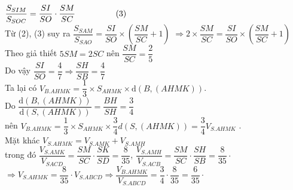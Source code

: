 \begin{ex}
{{
		}
\hspace*{0.2cm}$\dfrac{S_{SIM}}{S_{SOC}} = \dfrac{SI}{SO} \cdot \dfrac{SM}{SC} \hspace*{1.7cm} (3)$\\
Từ (2), (3) suy ra 
$ \dfrac{S_{SAM}}{S_{SAO}} = \dfrac{SI}{SO}\times \left(\dfrac{SM}{SC} + 1\right) $
$\Rightarrow 2 \times \dfrac{SM}{SC} = \dfrac{SI}{SO}\times \left(\dfrac{SM}{SC} + 1\right) $\\
Theo giả thiết $ 5SM = 2SC $ nên $ \dfrac{SM}{SC} = \dfrac{2}{5} $\\
Do vậy $ \dfrac{SI}{SO} = \dfrac{4}{7} \Rightarrow \dfrac{SH}{SB} = \dfrac{4}{7}   $\\
Ta lại có $ V_{B.AHMK} =\dfrac{1}{3} \times S_{AHMK} \times \mathrm{d}(B,(AHMK))$.\\
Do $ \dfrac{\mathrm{d}(B,(AHMK))}{\mathrm{d}(S,(AHMK))} = \dfrac{BH}{SH} = \dfrac{3}{4} $ \\nên $ V_{B.AHMK} = \dfrac{1}{3} \times S_{AHMK} \times \dfrac{3}{4}d(S,(AHMK)) = \dfrac{3}{4} V_{S.AHMK}$	 .\\
Mặt khác $V_{S.AHMK} = V_{S.AMK} +V_{S.AMH}$\\
trong đó $  \dfrac{V_{S.AMK}}{V_{SACD}} = \dfrac{SM}{SC} \cdot \dfrac{SK}{SD} = \dfrac{8}{35} $,
$  \dfrac{V_{S.AMH}}{V_{S.ACB}} = \dfrac{SM}{SC} \cdot \dfrac{SH}{SB} = \dfrac{8}{35} \cdot $\\
$ \Rightarrow V_{S.AHMK} = \dfrac{8}{35} \cdot V_{S.ABCD} \Rightarrow  \dfrac{V_{B.AHMK}}{V_{S.ABCD}} =\dfrac{3}{4} \cdot \dfrac{8}{35}  = \dfrac{6}{35} \cdot $		
	}
\end{ex}
